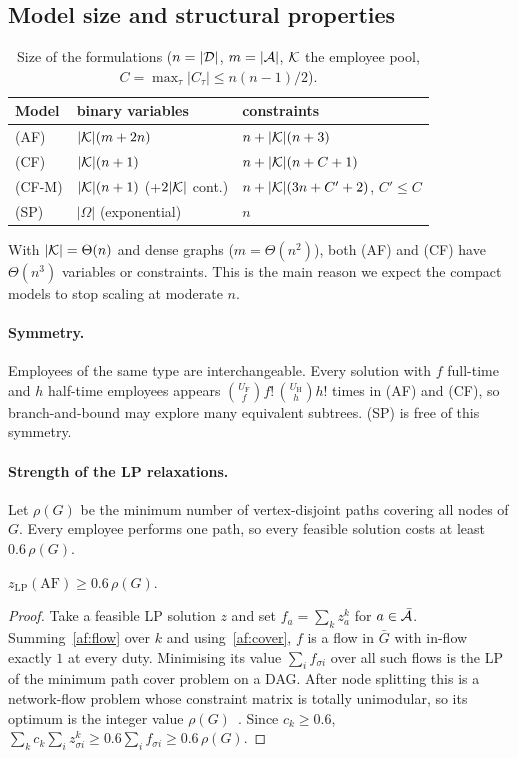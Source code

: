 \subsection{Model size and structural properties}
\label{sec:properties}

\begin{table}[ht]
\centering
\caption{Size of the formulations ($n=|\mathcal{D}|$, $m=|\mathcal{A}|$, $\mathcal{K}$ the employee
pool, $C=\max_\tau|C_\tau|\le n(n-1)/2$).}
\label{tab:size}
\begin{tabular}{lll}
\toprule
Model & binary variables & constraints \\
\midrule
(AF)   & $|\mathcal{K}|(m+2n)$ & $n+|\mathcal{K}|(n+3)$ \\
(CF)   & $|\mathcal{K}|(n+1)$  & $n+|\mathcal{K}|(n+C+1)$ \\
(CF-M) & $|\mathcal{K}|(n+1)$ (+$2|\mathcal{K}|$ cont.) & $n+|\mathcal{K}|(3n+C'+2)$, $C'\le C$ \\
(SP)   & $|\Omega|$ (exponential) & $n$ \\
\bottomrule
\end{tabular}
\end{table}

With $|\mathcal{K}|=\Theta(n)$ and dense graphs ($m=\Theta(n^2)$), both (AF) and (CF)
have $\Theta(n^3)$ variables or constraints. This is the main reason we expect
the compact models to stop scaling at moderate $n$.

\paragraph{Symmetry.}
Employees of the same type are interchangeable. Every solution with $f$
full-time and $h$ half-time employees appears $\binom{U_{\mathrm F}}{f}f!\,
\binom{U_{\mathrm H}}{h}h!$ times in (AF) and (CF), so branch-and-bound may
explore many equivalent subtrees. (SP) is free of this symmetry.

\paragraph{Strength of the LP relaxations.}
Let $\rho(G)$ be the minimum number of vertex-disjoint paths covering all
nodes of $G$. Every employee performs one path, so every feasible solution
costs at least $0.6\,\rho(G)$.

\begin{proposition}\label{prop:lp-af}
$z_{\mathrm{LP}}(\mathrm{AF})\ge 0.6\,\rho(G)$.
\end{proposition}
\begin{proof}
Take a feasible LP solution $z$ and set $f_a=\sum_k z^k_a$ for $a\in\bar{\mathcal{A}}$.
Summing~\eqref{af:flow} over $k$ and using~\eqref{af:cover}, $f$ is a flow in
$\bar G$ with in-flow exactly $1$ at every duty. Minimising its value
$\sum_i f_{\sigma i}$ over all such flows is the LP of the minimum path cover
problem on a DAG. After node splitting this is a network-flow problem whose
constraint matrix is totally unimodular, so its optimum is the integer value
$\rho(G)$~\cite{fulkerson1956}. Since $c_k\ge 0.6$,
$\sum_k c_k\sum_i z^k_{\sigma i}\ge 0.6\sum_i f_{\sigma i}\ge 0.6\,\rho(G)$.
\end{proof}

